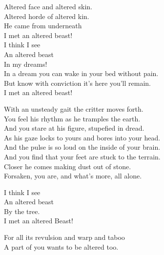 Altered face and altered skin. \\
Altered horde of altered kin. \\

He came from underneath \\
I met an altered beast! \\

I think I see \\
An altered beast \\
In my dreams! \\

In a dream you can wake in your bed without pain. \\
But know with conviction it's here you'll remain. \\

I met an altered beast! \\


With an unsteady gait the critter moves forth. \\
You feel his rhythm as he tramples the earth. \\

And you stare at his figure, stupefied in dread. \\
As his gaze locks to yours and bores into your head. \\

And the pulse is so loud on the inside of your brain. \\
And you find that your feet are stuck to the terrain. \\

Closer he comes making dust out of stone. \\
Forsaken, you are, and what's more, all alone. \\


I think I see \\
An altered beast \\
By the tree. \\

I met an altered Beast! \\





For all its revulsion and warp and taboo \\
A part of you wants to be altered too. \\

